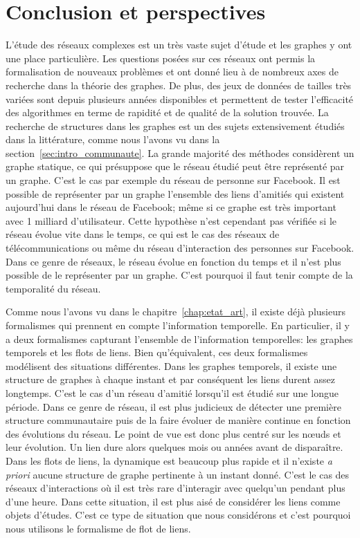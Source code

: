 \chapter{Conclusion et perspectives}




L'étude des réseaux complexes est un très vaste sujet d'étude et les graphes y ont une place particulière.
Les questions posées sur ces réseaux ont permis la formalisation de nouveaux problèmes et ont donné lieu à de nombreux axes de recherche dans la théorie des graphes.
De plus, des jeux de données de tailles très variées sont depuis plusieurs années disponibles et permettent de tester l'efficacité des algorithmes en terme de rapidité et de qualité de la solution trouvée.
La recherche de structures dans les graphes est un des sujets extensivement étudiés dans la littérature, comme nous l'avons vu dans la section~\ref{sec:intro_communaute}.
La grande majorité des méthodes considèrent un graphe statique, ce qui présuppose que le réseau étudié peut être représenté par un graphe.
C'est le cas par exemple du réseau de personne sur Facebook.
Il est possible de représenter par un graphe l'ensemble des liens d'amitiés qui existent aujourd'hui dans le réseau de Facebook; même si ce graphe est très important avec 1 milliard d'utilisateur.
Cette hypothèse n'est cependant pas vérifiée si le réseau évolue vite dans le temps, ce qui est le cas des réseaux de télécommunications ou même du réseau d'interaction des personnes sur Facebook.
Dans ce genre de réseaux, le réseau évolue en fonction du temps et il n'est plus possible de le représenter par un graphe.
C'est pourquoi il faut tenir compte de la temporalité du réseau.


Comme nous l'avons vu dans le chapitre~\ref{chap:etat_art}, il existe déjà plusieurs formalismes qui prennent en compte l'information temporelle.
En particulier, il y a deux formalismes capturant l'ensemble de l'information temporelles: les graphes temporels et les flots de liens.
Bien qu'équivalent, ces deux formalismes modélisent des situations différentes.
Dans les graphes temporels, il existe une structure de graphes à chaque instant et par conséquent les liens durent assez longtemps.
C'est le cas d'un réseau d'amitié lorsqu'il est étudié sur une longue période.
Dans ce genre de réseau, il est plus judicieux de détecter une première structure communautaire puis de la faire évoluer de manière continue en fonction des évolutions du réseau.
Le point de vue est donc plus centré sur les n\oe uds et leur évolution.
Un lien dure alors quelques mois ou années avant de disparaître.
Dans les flots de liens, la dynamique est beaucoup plus rapide et il n'existe \emph{a priori} aucune structure de graphe pertinente à un instant donné.
C'est le cas des réseaux d'interactions où il est très rare d'interagir avec quelqu'un pendant plus d'une heure.
Dans cette situation, il est plus aisé de considérer les liens comme objets d'études.
C'est ce type de situation que nous considérons et c'est pourquoi nous utilisons le formalisme de flot de liens.


